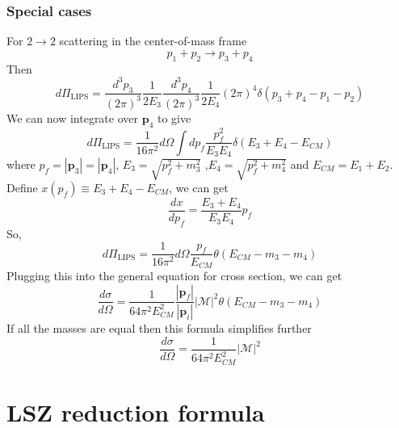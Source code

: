 \documentclass[cyan]{elegantnote}
\begin{document}
\subsubsection{Special cases}
\noindent
For $2 \to 2$ scattering in the center-of-mass frame
\[p_1 + p_2 \to p_3 + p_4\]
Then
\[d\Pi_{\mathrm{LIPS}} = \frac{d^3p_3}{(2\pi)^3} \frac{1}{2E_3 } \frac{d^3p_4}{(2\pi)^3} \frac{1}{2E_4} (2\pi)^4 \delta(p_3+p_4-p_1-p_2)\]
We can now integrate over $\bm{p}_4$ to give
\[d\Pi_{\mathrm{LIPS}} = \frac{1}{16\pi^2} d\Omega \int dp_f \frac{p_f^2}{E_3 E_4} \delta(E_3+E_4 -E_{CM})\]
where $p_f = |\bm{p}_3| = |\bm{p}_4|$, $E_3 = \sqrt{p_f^2 + m_3^2}$ ,$E_4 = \sqrt{p_f^2 + m_4^2}$ and $E_{CM} = E_1 + E_2$. 
Define $x(p_f) \equiv E_3 + E_4 - E_{CM}$, we can get
\[\frac{dx}{dp_f} = \frac{E_3+E_4}{E_3 E_4}p_f\]
So,
\[d\Pi_{\mathrm{LIPS}} = \frac{1}{16\pi^2} d\Omega \frac{p_f}{E_{CM}}\theta (E_{CM} - m_3 -m_4)\]
Plugging this into the general equation for cross section, we can get
\[ \frac{d\sigma}{d\Omega} = \frac{1}{64\pi^2 E_{CM}^2} \frac{|\bm{p}_f|}{|\bm{p}_i|} |\mathcal{M}|^2 \theta (E_{CM} - m_3 -m_4) \]
If all the masses are equal then this formula simplifies further
\[\frac{d\sigma}{d\Omega} = \frac{1}{64\pi^2 E_{CM}^2} |\mathcal{M}|^2\]
\newpage

\section{LSZ reduction formula}
\end{document}
